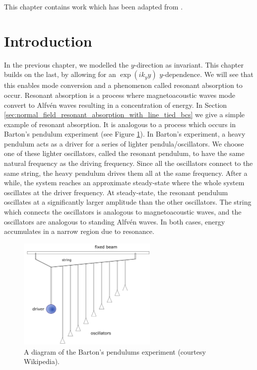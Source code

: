 This chapter contains work which has been adapted from \citet{Prokopyszyn2021}.

\section{Introduction}

In the previous chapter, we modelled the $y$-direction as invariant. This chapter builds on the last, by allowing for an $\exp(ik_y y)$  $y$-dependence. We will see that this enables mode conversion and a phenomenon called resonant absorption to occur.
Resonant absorption is a process where magnetoacoustic waves mode convert to Alfv\'en waves resulting in a concentration of energy. In Section \ref{sec:normal_field_resonant_absorption_with_line_tied_bcs} we give a simple example of resonant absorption. It is analogous to a process which occurs in Barton's pendulum experiment (see Figure \ref{fig:bartons_pendulums}). In Barton's experiment, a heavy pendulum acts as a driver for a series of lighter pendula/oscillators. We choose one of these lighter oscillators, called the resonant pendulum, to have the same natural frequency as the driving frequency. Since all the oscillators connect to the same string, the heavy pendulum drives them all at the same frequency. After a while, the system reaches an approximate steady-state where the whole system oscillates at the driver frequency. At steady-state, the resonant pendulum oscillates at a significantly larger amplitude than the other oscillators. The string which connects the oscillators is analogous to magnetoacoustic waves, and the oscillators are analogous to standing Alfv\'en waves. In both cases, energy accumulates in a narrow region due to resonance.

\begin{figure}
    \centering
    \vspace{-20pt}
    \includegraphics[width = 0.6\textwidth]{figures/chapter04/bartons_pendulums.png}
    \vspace{-10pt}
    \caption{A diagram of the Barton's pendulums experiment (courtesy Wikipedia).}
    \vspace{-10pt}
    \label{fig:bartons_pendulums}
\end{figure}

